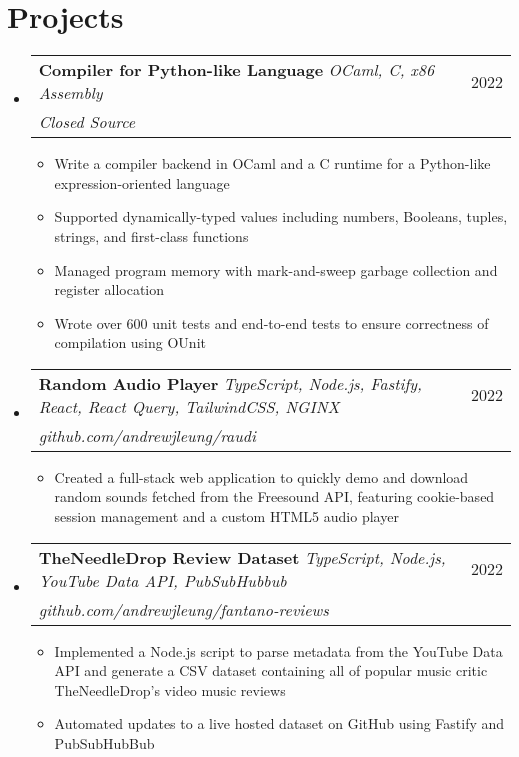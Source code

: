 \documentclass[letterpaper, 11pt]{article}
\makeatletter
\newcommand{\resumeItem}[1]{
  \item\small{
    {#1 \vspace{-2pt}}
  }
}
\newcommand{\resumeProjectHeading}[3]{
    \item
    \begin{tabular*}{0.97\textwidth}{l@{\extracolsep{\fill}}r}
      \small#1 & #2 \\
     \textit{\small{#3}}
    \end{tabular*}\vspace{-7pt}
}
\newcommand{\resumeSubHeadingListStart}{\begin{itemize}[leftmargin=0.15in, label={}]}
\newcommand{\resumeSubHeadingListEnd}{\end{itemize}}
\newcommand{\resumeItemListStart}{\begin{itemize}}
\newcommand{\resumeItemListEnd}{\end{itemize}\vspace{-5pt}}
\makeatother
\begin{document}
\section{Projects}
    \resumeSubHeadingListStart
        \resumeProjectHeading
            {\textbf{Compiler for Python-like Language} \emph{OCaml, C, x86 Assembly}}{2022}{Closed Source}
            \resumeItemListStart
                \resumeItem{Write a compiler backend in OCaml and a C runtime for a Python-like expression-oriented language}
                \resumeItem{Supported dynamically-typed values including numbers, Booleans, tuples, strings, and first-class functions}
                \resumeItem{Managed program memory with mark-and-sweep garbage collection and register allocation}
                \resumeItem{Wrote over 600 unit tests and end-to-end tests to ensure correctness of compilation using OUnit}
            \resumeItemListEnd
        \resumeProjectHeading
            {\textbf{Random Audio Player} \emph{TypeScript, Node.js, Fastify, React, React Query, TailwindCSS, NGINX}}{2022}{github.com/andrewjleung/raudi}
            \resumeItemListStart
                \resumeItem{Created a full-stack web application to quickly demo and download random sounds fetched from the Freesound API, featuring cookie-based session management and a custom HTML5 audio player}
            \resumeItemListEnd
        \resumeProjectHeading
            {\textbf{TheNeedleDrop Review Dataset} \emph{TypeScript, Node.js, YouTube Data API, PubSubHubbub}}{2022}{github.com/andrewjleung/fantano-reviews}
            \resumeItemListStart
                \resumeItem{Implemented a Node.js script to parse metadata from the YouTube Data API and generate a CSV dataset containing all of popular music critic TheNeedleDrop's video music reviews}
                \resumeItem{Automated updates to a live hosted dataset on GitHub using Fastify and PubSubHubBub}
            \resumeItemListEnd  
    \resumeSubHeadingListEnd

\end{document}
